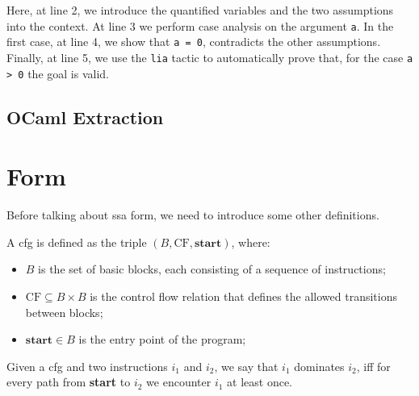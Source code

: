 Here, at line 2, we introduce the quantified variables and the two assumptions into the context. At line 3 we perform case analysis on the argument \texttt a. In the first case, at line 4, we show that \texttt{a = 0}, contradicts the other assumptions. Finally, at line 5, we use the \texttt{lia} tactic to automatically prove that, for the case \texttt{a > 0} the goal is valid.

\subsection{OCaml Extraction}
\label{subsec:extract}

\section{ Form}
\label{sec:ssa}


Before talking about \gls{ssa} form, we need to introduce some other definitions.

\begin{definition}\label{def:cfg}
  A \gls{cfg} is defined as the triple $(B, \text{CF}, \textbf{start})$, where:
  \begin{itemize}
    \item $B$ is the set of basic blocks, each consisting of a sequence of instructions;
    \item $\text{CF} \subseteq B \times B$ is the control flow relation that defines the allowed transitions between blocks;
    \item $\textbf{start} \in B$ is the entry point of the program;
  \end{itemize}
\end{definition}

\begin{definition}[Dominance]
  Given a \gls{cfg} and two instructions $i_1$ and $i_2$, we say that $i_1$ dominates $i_2$, iff for every path from \textbf{start} to $i_2$ we encounter $i_1$ at least once.
\end{definition}

